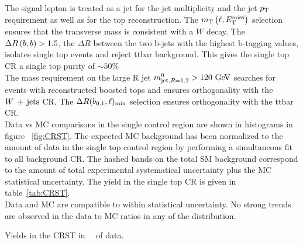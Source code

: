 \indent The signal lepton is treated as a jet for the jet multiplicity and the jet $p_{\mathrm{T}}$ requirement as well as for the top reconstruction.  The $m_{\mathrm{T}}\left(\ell,E_{\mathrm{T}}^{\mathrm{miss}}\right)$ selection ensures that the transverse mass is consistent with a $W$ decay.  The $\Delta R\left(b,b\right) > 1.5$, the $\Delta R$ between the two b-jets with the highest b-tagging values, isolates single top events and reject ttbar background.  This gives the single top CR a single top purity of $\sim50\%$ \\

\indent The mass requirement on the large R jet $\mantikttwelvezero > 120 \gev$ searches for events with reconstructed boosted tops and ensures orthogonality with the $W\,+\,\mathrm{jets}$ CR.  The $\Delta R(b_{0,1},\ell)_{\mathrm{min}}$ selection ensures orthogonality with the ttbar CR.  \\

\indent Data vs MC comparisons in the single control region are shown in histograms in figure ~\ref{fig:CRST}.  The expected MC background has been normalized to the amount of data in the single top control region by performing a simultaneous fit to all background CR.  The hashed bands on the total SM background correspond to the amount of total experimental systematical uncertainty plus the MC statistical uncertainty.  The yield in the single top CR is given in table~\ref{tab:CRST}.  \\

\indent  Data and MC are compatible to within statistical uncertainty.  No strong trends are observed in the data to MC ratios in any of the distribution. \\

\begin{table}[!htb]
  \centering
  
  \caption{Yields in the CRST in \intlumi\ \ifb\ of data.  }
  \label{tab:CRST}
\end{table}


